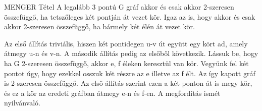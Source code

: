 \begin{tetel}{MENGER Tétel}
A legalább 3 pontú G gráf akkor és csak akkor 2-szeresen összefüggő, ha tetszőleges két pontján át vezet kör. Igaz az is, hogy akkor és csak akkor 2-szeresen összefüggő, ha bármely két élén át vezet kör.
\end{tetel}

\begin{bizonyitas}{}
Az első állítás triviális, hiszen két pontidegen u-v út együtt egy kört ad, amely átmegy u-n és v-n. A második állítás pedig az elsőből következik. Lássuk be, hogy ha G 2-szeresen összefüggő, akkor e, f éleken keresztül van kör. Vegyünk fel két pontot úgy, hogy ezekkel osszuk két részre az e illetve az f élt. Az így kapott gráf is 2-szeresen összefüggő. Az első állítás szerint ezen a két ponton át is megy kör, és ez a kör az eredeti gráfban átmegy e-n és f-en. A megfordítás ismét nyilvánvaló.
\end{bizonyitas}

